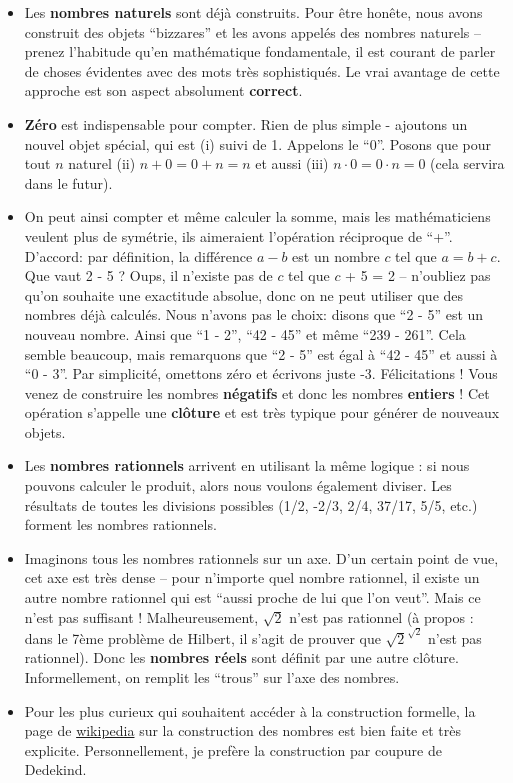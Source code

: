 \documentclass[12pt, a4paper]{article}
\begin{document}
\begin{itemize}
	\item Les \textbf{nombres naturels} sont déjà construits. Pour être honête, nous avons construit des objets ``bizzares'' et les avons appelés des nombres naturels -- prenez l'habitude qu'en mathématique fondamentale, il est courant de parler de choses évidentes avec des mots très sophistiqués. Le vrai avantage de cette approche est son aspect absolument \textbf{correct}.
	\item \textbf{Zéro} est indispensable pour compter. Rien de plus simple - ajoutons un nouvel objet spécial, qui est (i) suivi de 1. Appelons le ``0''. Posons que pour tout $n$ naturel (ii) $n + 0 = 0 + n = n$ et aussi (iii) $n \cdot 0 = 0 \cdot n = 0$ (cela servira dans le futur).
	\item On peut ainsi compter et même calculer la somme, mais les mathématiciens veulent plus de symétrie, ils aimeraient l'opération réciproque de ``+''. D'accord: par définition, la différence $a - b$ est un nombre $c$ tel que $a = b + c$. Que vaut 2 - 5 ? Oups, il n'existe pas de $c$ tel que $c$ + 5 = 2 -- n'oubliez pas qu'on souhaite une exactitude absolue, donc on ne peut utiliser que des nombres déjà calculés. Nous n'avons pas le choix: disons que ``2 - 5'' est un nouveau nombre. Ainsi que ``1 - 2'', ``42 - 45'' et même ``239 - 261''. Cela semble beaucoup, mais remarquons que ``2 - 5'' est égal à ``42 - 45'' et aussi à ``0 - 3''. Par simplicité, omettons zéro et écrivons juste -3. Félicitations ! Vous venez de construire les nombres \textbf{négatifs} et donc les nombres \textbf{entiers} !
	Cet opération s'appelle une \textbf{clôture} et est très typique pour générer de nouveaux objets.
	\item Les \textbf{nombres rationnels} arrivent en utilisant la même logique : si nous pouvons calculer le produit, alors nous voulons également diviser. Les résultats de toutes les divisions possibles (1/2, -2/3, 2/4, 37/17, 5/5, etc.) forment les nombres rationnels.
	\item Imaginons tous les nombres rationnels sur un axe. D'un certain point de vue, cet axe est très dense -- pour n'importe quel nombre rationnel, il existe un autre nombre rationnel qui est ``aussi proche de lui que l'on veut''. Mais ce n'est pas suffisant ! Malheureusement, $\sqrt{2}$ n'est pas rationnel (à propos : dans le 7ème problème de Hilbert, il s'agit de prouver que $\sqrt2^{\sqrt2}$ n'est pas rationnel).
	Donc les \textbf{nombres réels} sont définit par une autre clôture. Informellement, on remplit les ``trous'' sur l'axe des nombres.
	\item Pour les plus curieux qui souhaitent accéder à la construction formelle, la page de
	\href{
		/wiki/Construction_des_nombres_r%
		}{wikipedia} sur la construction des nombres est bien faite et très explicite.
	Personnellement, je prefère la construction par coupure de Dedekind.
\end{itemize}
\end{document}
